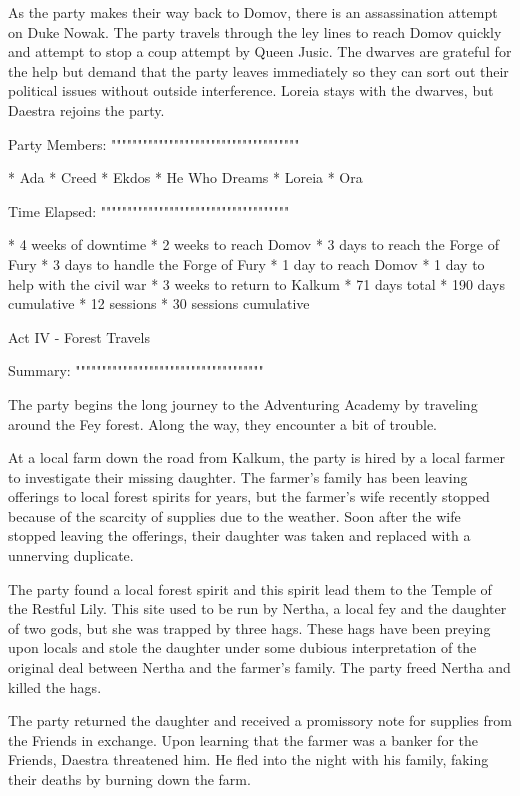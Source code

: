 As the party makes their way back to Domov, there is an assassination attempt on Duke Nowak.
The party travels through the ley lines to reach Domov quickly and attempt to stop a coup attempt by Queen Jusic.
The dwarves are grateful for the help but demand that the party leaves immediately so they can sort out their political issues without outside interference.
Loreia stays with the dwarves, but Daestra rejoins the party.

Party Members:
""""""""""""""""""""""""""""""""""""

  * Ada
  * Creed
  * Ekdos
  * He Who Dreams
  * Loreia
  * Ora

Time Elapsed:
""""""""""""""""""""""""""""""""""""

  * 4 weeks of downtime
  * 2 weeks to reach Domov
  * 3 days to reach the Forge of Fury
  * 3 days to handle the Forge of Fury
  * 1 day to reach Domov
  * 1 day to help with the civil war
  * 3 weeks to return to Kalkum
  * 71 days total
  * 190 days cumulative
  * 12 sessions
  * 30 sessions cumulative

Act IV - Forest Travels
^^^^^^^^^^^^^^^^^^^^^^^^^^^^^^^^^^^^

Summary:
""""""""""""""""""""""""""""""""""""

The party begins the long journey to the Adventuring Academy by traveling around the Fey forest.
Along the way, they encounter a bit of trouble.

At a local farm down the road from Kalkum, the party is hired by a local farmer to investigate their missing daughter.
The farmer's family has been leaving offerings to local forest spirits for years, but the farmer's wife recently stopped because of the scarcity of supplies due to the weather.
Soon after the wife stopped leaving the offerings, their daughter was taken and replaced with a unnerving duplicate.

The party found a local forest spirit and this spirit lead them to the Temple of the Restful Lily.
This site used to be run by Nertha, a local fey and the daughter of two gods, but she was trapped by three hags.
These hags have been preying upon locals and stole the daughter under some dubious interpretation of the original deal between Nertha and the farmer's family.
The party freed Nertha and killed the hags.

The party returned the daughter and received a promissory note for supplies from the Friends in exchange.
Upon learning that the farmer was a banker for the Friends, Daestra threatened him.
He fled into the night with his family, faking their deaths by burning down the farm.

